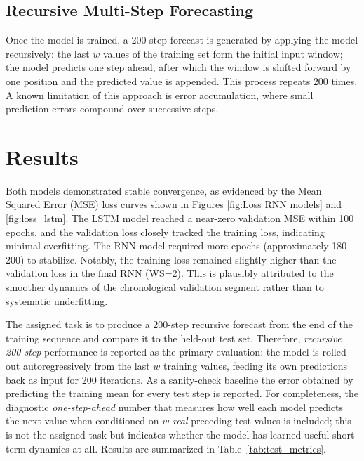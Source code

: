 \documentclass[conference]{IEEEtran}
\begin{document}
\subsection{Recursive Multi-Step Forecasting}
Once the model is trained, a 200-step forecast is generated by applying the model recursively: the last $w$ values of the training set form the initial input window; the model predicts one step ahead, after which the window is shifted forward by one position and the predicted value is appended. This process repeats 200 times. A known limitation of this approach is error accumulation, where small prediction errors compound over successive steps.

\section{Results}
\label{Results}


Both models demonstrated stable convergence, as evidenced by the Mean Squared Error (MSE) loss curves shown in Figures \ref{fig:Loss RNN models} and \ref{fig:loss_lstm}. The LSTM model reached a near-zero validation MSE within 100 epochs, and the validation loss closely tracked the training loss, indicating minimal overfitting. The RNN model required more epochs (approximately 180--200) to stabilize. Notably, the training loss remained slightly higher than the validation loss in the final RNN (WS=2). This is plausibly attributed to the smoother dynamics of the chronological validation segment rather than to systematic underfitting.

The assigned task is to produce a 200-step recursive forecast from the end of the training sequence and compare it to the held-out test set. Therefore, \emph{recursive 200-step} performance is reported as the primary evaluation: the model is rolled out autoregressively from the last $w$ training values, feeding its own predictions back as input for 200 iterations. As a sanity-check baseline the error obtained by predicting the training mean for every test step is reported. For completeness, the diagnostic \emph{one-step-ahead} number that measures how well each model predicts the next value when conditioned on $w$ \emph{real} preceding test values is included; this is not the assigned task but indicates whether the model has learned useful short-term dynamics at all. Results are summarized in Table~\ref{tab:test_metrics}.
\end{document}
